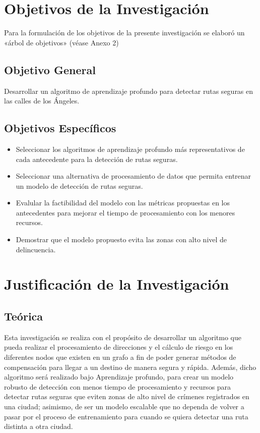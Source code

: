\section{Objetivos de la Investigación}
Para la formulación de los objetivos de la presente investigación se elaboró un «árbol de objetivos» (véase Anexo 2) 
\subsection{Objetivo General}
\newcommand{\ObjetivoGeneral}{
Desarrollar un algoritmo de aprendizaje profundo para detectar rutas seguras en las calles de los Ángeles.
}
\ObjetivoGeneral
\subsection{Objetivos Espec\'{i}ficos}
\newcommand{\Objone}{
Seleccionar los algoritmos de aprendizaje profundo más representativos de cada antecedente para la detección de rutas seguras.
}
\newcommand{\Objtwo}{
Seleccionar una alternativa de procesamiento de datos que permita entrenar un modelo de detección de rutas seguras.
}
\newcommand{\Objthree}{
Evalular la factibilidad del modelo con las métricas propuestas en los antecedentes para mejorar el tiempo de procesamiento con los menores recursos.
}
\newcommand{\Objfour}{
Demostrar que el modelo propuesto evita las zonas con alto nivel de delincuencia.
}

\begin{itemize}
	\item {\Objone}
	\item {\Objtwo}
	\item {\Objthree}
	\item {\Objfour}
\end{itemize}

\section{Justificación de la Investigación}

\subsection{Teórica}
Esta investigación se realiza con el propósito de desarrollar un algoritmo que pueda realizar el procesamiento de direcciones y el cálculo de riesgo en los diferentes nodos que existen en un grafo a fin de poder generar métodos de compensación para llegar a un destino de manera segura y rápida. Además, dicho algoritmo será realizado bajo Aprendizaje profundo, para crear un modelo robusto de detección con menos tiempo de procesamiento y recursos para detectar rutas seguras que eviten zonas de alto nivel de crímenes registrados en una ciudad; asimismo, de ser un modelo escalable que no dependa de volver a pasar por el proceso de entrenamiento para cuando se quiera detectar una ruta distinta a otra ciudad.

